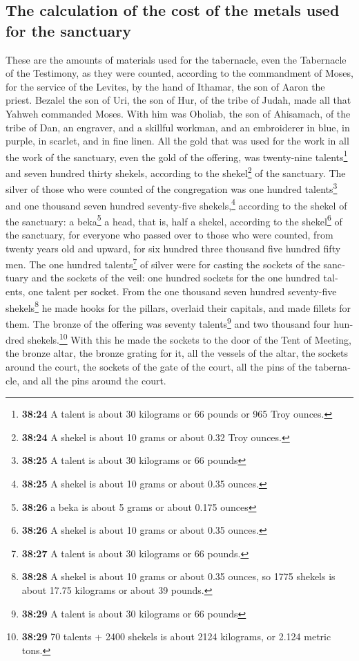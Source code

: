 \begin{paracol}{2}
\begin{otherlanguage}{english}
\hypertarget{the-calculation-of-the-cost-of-the-metals-used-for-the-sanctuary}{%
\subsection{The calculation of the cost of the metals used for the
sanctuary}\label{the-calculation-of-the-cost-of-the-metals-used-for-the-sanctuary}}

 These are the amounts of materials used for the
tabernacle, even the Tabernacle of the Testimony, as they were counted,
according to the commandment of Moses, for the service of the Levites,
by the hand of Ithamar, the son of Aaron the priest. 
Bezalel the son of Uri, the son of Hur, of the tribe of Judah, made all
that Yahweh commanded Moses.  With him was Oholiab, the
son of Ahisamach, of the tribe of Dan, an engraver, and a skillful
workman, and an embroiderer in blue, in purple, in scarlet, and in fine
linen.  All the gold that was used for the work in all
the work of the sanctuary, even the gold of the offering, was
twenty-nine talents\footnote{\textbf{38:24} A talent is about 30
  kilograms or 66 pounds or 965 Troy ounces.} and seven hundred thirty
shekels, according to the shekel\footnote{\textbf{38:24} A shekel is
  about 10 grams or about 0.32 Troy ounces.} of the sanctuary.
 The silver of those who were counted of the congregation
was one hundred talents\footnote{\textbf{38:25} A talent is about 30
  kilograms or 66 pounds} and one thousand seven hundred seventy-five
shekels,\footnote{\textbf{38:25} A shekel is about 10 grams or about
  0.35 ounces.} according to the shekel of the sanctuary:
 a beka\footnote{\textbf{38:26} a beka is about 5 grams
  or about 0.175 ounces} a head, that is, half a shekel, according to
the shekel\footnote{\textbf{38:26} A shekel is about 10 grams or about
  0.35 ounces.} of the sanctuary, for everyone who passed over to those
who were counted, from twenty years old and upward, for six hundred
three thousand five hundred fifty men.  The one hundred
talents\footnote{\textbf{38:27} A talent is about 30 kilograms or 66
  pounds.} of silver were for casting the sockets of the sanctuary and
the sockets of the veil: one hundred sockets for the one hundred
talents, one talent per socket.  From the one thousand
seven hundred seventy-five shekels\footnote{\textbf{38:28} A shekel is
  about 10 grams or about 0.35 ounces, so 1775 shekels is about 17.75
  kilograms or about 39 pounds.} he made hooks for the pillars, overlaid
their capitals, and made fillets for them.  The bronze of
the offering was seventy talents\footnote{\textbf{38:29} A talent is
  about 30 kilograms or 66 pounds} and two thousand four hundred
shekels.\footnote{\textbf{38:29} 70 talents + 2400 shekels is about 2124
  kilograms, or 2.124 metric tons.}  With this he made
the sockets to the door of the Tent of Meeting, the bronze altar, the
bronze grating for it, all the vessels of the altar,  the
sockets around the court, the sockets of the gate of the court, all the
pins of the tabernacle, and all the pins around the court.


\end{otherlanguage}
\end{paracol}
